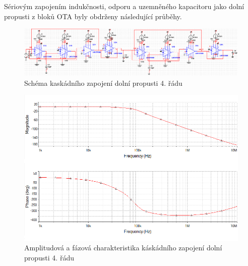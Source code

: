 \documentclass[twoside]{article}
\begin{document}
\noindent Sériovým zapojením indukčnosti, odporu a uzemněného kapacitoru jako dolní propusti z bloků OTA byly obdrženy následující průběhy.
\begin{figure}[H]
\centering
\includegraphics[scale=0.6]{lrcx2.png}
\caption{Schéma kaskádního zapojení dolní propusti 4. řádu}
\end{figure}
\begin{figure}[H]
\centering
\includegraphics[scale=0.75]{lrcx2ampl.png}
\caption{Amplitudová a fázová charakteristika káskádního zapojení dolní propusti 4. řádu}
\end{figure}
\newpage
\end{document}
